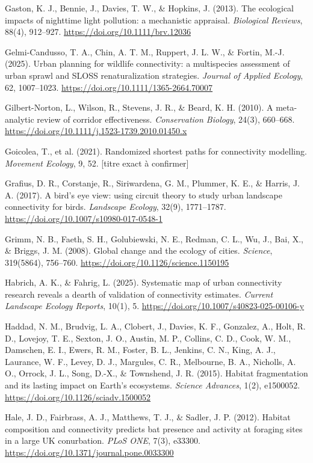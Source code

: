 \documentclass[a4paper,11pt]{report}
\begin{document}
Gaston, K. J., Bennie, J., Davies, T. W., \& Hopkins, J. (2013). The ecological impacts of nighttime light pollution: a mechanistic appraisal. \textit{Biological Reviews}, 88(4), 912--927. \url{https://doi.org/10.1111/brv.12036}

Gelmi-Candusso, T. A., Chin, A. T. M., Ruppert, J. L. W., \& Fortin, M.-J. (2025). Urban planning for wildlife connectivity: a multispecies assessment of urban sprawl and SLOSS renaturalization strategies. \textit{Journal of Applied Ecology}, 62, 1007--1023. \url{https://doi.org/10.1111/1365-2664.70007}

Gilbert-Norton, L., Wilson, R., Stevens, J. R., \& Beard, K. H. (2010). A meta-analytic review of corridor effectiveness. \textit{Conservation Biology}, 24(3), 660--668. \url{https://doi.org/10.1111/j.1523-1739.2010.01450.x}

Goicolea, T., et al. (2021). Randomized shortest paths for connectivity modelling. \textit{Movement Ecology}, 9, 52. [titre exact à confirmer]

Grafius, D. R., Corstanje, R., Siriwardena, G. M., Plummer, K. E., \& Harris, J. A. (2017). A bird's eye view: using circuit theory to study urban landscape connectivity for birds. \textit{Landscape Ecology}, 32(9), 1771--1787. \url{https://doi.org/10.1007/s10980-017-0548-1}

Grimm, N. B., Faeth, S. H., Golubiewski, N. E., Redman, C. L., Wu, J., Bai, X., \& Briggs, J. M. (2008). Global change and the ecology of cities. \textit{Science}, 319(5864), 756--760. \url{https://doi.org/10.1126/science.1150195}

Habrich, A. K., \& Fahrig, L. (2025). Systematic map of urban connectivity research reveals a dearth of validation of connectivity estimates. \textit{Current Landscape Ecology Reports}, 10(1), 5. \url{https://doi.org/10.1007/s40823-025-00106-y}

Haddad, N. M., Brudvig, L. A., Clobert, J., Davies, K. F., Gonzalez, A., Holt, R. D., Lovejoy, T. E., Sexton, J. O., Austin, M. P., Collins, C. D., Cook, W. M., Damschen, E. I., Ewers, R. M., Foster, B. L., Jenkins, C. N., King, A. J., Laurance, W. F., Levey, D. J., Margules, C. R., Melbourne, B. A., Nicholls, A. O., Orrock, J. L., Song, D.-X., \& Townshend, J. R. (2015). Habitat fragmentation and its lasting impact on Earth's ecosystems. \textit{Science Advances}, 1(2), e1500052. \url{https://doi.org/10.1126/sciadv.1500052}

Hale, J. D., Fairbrass, A. J., Matthews, T. J., \& Sadler, J. P. (2012). Habitat composition and connectivity predicts bat presence and activity at foraging sites in a large UK conurbation. \textit{PLoS ONE}, 7(3), e33300. \url{https://doi.org/10.1371/journal.pone.0033300}
\end{document}
